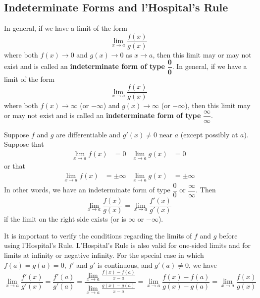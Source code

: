 \subsection{Indeterminate Forms and l'Hospital's Rule}

In general, if we have a limit of the form
\[\lim_{x\to a}\frac{f(x)}{g(x)}\]
where both \(f(x)\to 0\) and \(g(x)\to 0\) as \(x\to a\), then this limit may
or may not exist and is called an \textbf{indeterminate form of type}
\(\mathbf{\dfrac{0}{0}}\).
In general, if we have a limit of the form
\[\lim_{x\to a}\frac{f(x)}{g(x)}\]
where both \(f(x)\to\infty\) (or \(-\infty\)) and \(g(x)\to\infty\)
(or \(-\infty\)), then this limit may or may not exist and is called an
\textbf{indeterminate form of type} \(\mathbf{\dfrac{\infty}{\infty}}\).
\begin{theorem}
    Suppose \(f\) and \(g\) are differentiable and \(g'(x)\neq 0\) near \(a\)
    (except possibly at \(a\)).
    Suppose that
    \begin{align*}
        \lim_{x\to a}f(x) &= 0 & \lim_{x\to a}g(x) &= 0
    \end{align*}
    or that
    \begin{align*}
        \lim_{x\to a}f(x) &= \pm\infty & \lim_{x\to a}g(x) &= \pm\infty
    \end{align*}
    In other words, we have an indeterminate form of type \(\dfrac{0}{0}\) or
    \(\dfrac{\infty}{\infty}\).
    Then
    \[\lim_{x\to a}\frac{f(x)}{g(x)}=\lim_{x\to a}\frac{f'(x)}{g'(x)}\]
    if the limit on the right side exists (or is \(\infty\) or \(-\infty\)).
\end{theorem}
It is important to verify the conditions regarding the limits of \(f\) and \(g\) before using
l'Hospital's Rule.
L'Hospital's Rule is also valid for one-sided limits and for limits at
infinity or negative infinity.
For the special case in which \(f(a)=g(a)=0\), \(f'\) and \(g'\) is
continuous, and \(g'(a)\neq 0\), we have
\[\lim_{x\to a}\frac{f'(x)}{g'(x)}=\frac{f'(a)}{g'(a)}
= \frac{\displaystyle{\lim_{x\to a}\frac{f(x)-f(a)}{x-a}}}
{\displaystyle{\lim_{x\to a}\frac{g(x)-g(a)}{x-a}}}
=\lim_{x\to a}\frac{f(x)-f(a)}{g(x)-g(a)}=\lim_{x\to a}\frac{f(x)}{g(x)}\]

